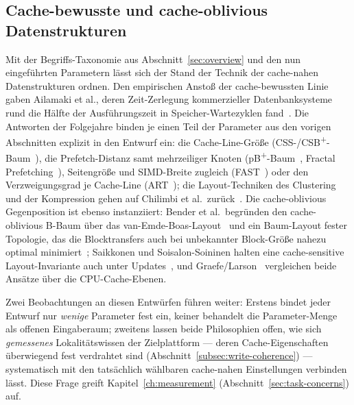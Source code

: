 \begin{nurkurz}
\subsection{Cache-bewusste und cache-oblivious Datenstrukturen}\label{subsec:cc-structures}
Mit der Begriffs-Taxonomie aus Abschnitt~\ref{sec:overview} und den nun eingeführten Parametern lässt sich der
Stand der Technik der cache-nahen Datenstrukturen ordnen. Den empirischen Anstoß der cache-bewussten Linie gaben
Ailamaki et al., deren Zeit-Zerlegung kommerzieller Datenbanksysteme rund die Hälfte der Ausführungszeit in
Speicher-Wartezyklen fand~\cite{ailamaki1999dbms}. Die Antworten der Folgejahre binden je einen Teil der Parameter
aus den vorigen Abschnitten explizit in den Entwurf ein: die Cache-Line-Größe
(CSS-/CSB\textsuperscript{+}-Baum~\cite{rao1999css,rao2000csb}), die Prefetch-Distanz samt mehrzeiliger Knoten
(pB\textsuperscript{+}-Baum~\cite{chen2001prefetch}, Fractal Prefetching~\cite{chen2002fractal}), Seitengröße und
SIMD-Breite zugleich (FAST~\cite{kim2010fast}) oder den Verzweigungsgrad je Cache-Line (ART~\cite{leis2013art}); die
Layout-Techniken des Clustering und der Kompression gehen auf Chilimbi et al.\ zurück~\cite{chilimbi1999layout}. Die
cache-oblivious Gegenposition ist ebenso instanziiert: Bender et al.\ begründen den cache-oblivious B-Baum über das
van-Emde-Boas-Layout~\cite{bender2005coboblivious} und ein Baum-Layout fester Topologie, das die Blocktransfers auch
bei unbekannter Block-Größe nahezu optimal minimiert~\cite{bender2002treelayout,bender2000cobtree}; Saikkonen und
Soisalon-Soininen halten eine cache-sensitive Layout-Invariante auch unter
Updates~\cite{saikkonen2008multilevel,saikkonen2016layout}, und Graefe/Larson~\cite{graefe2001btree} vergleichen
beide Ansätze über die CPU-Cache-Ebenen.

Zwei Beobachtungen an diesen Entwürfen führen weiter: Erstens bindet jeder Entwurf nur \emph{wenige} Parameter fest
ein, keiner behandelt die Parameter-Menge als offenen Eingaberaum; zweitens lassen beide Philosophien offen, wie
sich \emph{gemessenes} Lokalitätswissen der Zielplattform --- deren Cache-Eigenschaften überwiegend fest verdrahtet
sind (Abschnitt~\ref{subsec:write-coherence}) --- systematisch mit den tatsächlich wählbaren cache-nahen
Einstellungen verbinden lässt. Diese Frage greift Kapitel~\ref{ch:measurement} (Abschnitt~\ref{sec:task-concerns})
auf.
\end{nurkurz}

